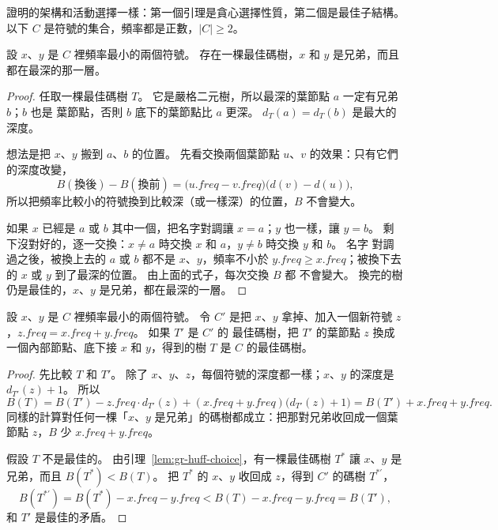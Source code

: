 證明的架構和活動選擇一樣：第一個引理是貪心選擇性質，第二個是最佳子結構。 以下 $C$
是符號的集合，頻率都是正數，$|C| \ge 2$。

\begin{lemma}
\label{lem:gr-huff-choice}
設 $x$、$y$ 是 $C$ 裡頻率最小的兩個符號。 存在一棵最佳碼樹，$x$ 和 $y$ 是兄弟，而且
都在最深的那一層。
\end{lemma}

\begin{proof}
任取一棵最佳碼樹 $T$。 它是嚴格二元樹，所以最深的葉節點 $a$ 一定有兄弟 $b$；$b$ 也是
葉節點，否則 $b$ 底下的葉節點比 $a$ 更深。 $d_T(a) = d_T(b)$ 是最大的深度。

想法是把 $x$、$y$ 搬到 $a$、$b$ 的位置。 先看交換兩個葉節點 $u$、$v$ 的效果：只有它們
的深度改變，
\[
B(\text{換後}) - B(\text{換前}) = \bigl(u.\mathit{freq} - v.\mathit{freq}\bigr)
\bigl(d(v) - d(u)\bigr),
\]
所以把頻率比較小的符號換到比較深（或一樣深）的位置，$B$ 不會變大。

如果 $x$ 已經是 $a$ 或 $b$ 其中一個，把名字對調讓 $x = a$；$y$ 也一樣，讓 $y = b$。
剩下沒對好的，逐一交換：$x \ne a$ 時交換 $x$ 和 $a$，$y \ne b$ 時交換 $y$ 和 $b$。 名字
對調過之後，被換上去的 $a$ 或 $b$ 都不是 $x$、$y$，頻率不小於 $y.\mathit{freq} \ge
x.\mathit{freq}$；被換下去的 $x$ 或 $y$ 到了最深的位置。 由上面的式子，每次交換 $B$ 都
不會變大。 換完的樹仍是最佳的，$x$、$y$ 是兄弟，都在最深的一層。
\end{proof}

\begin{lemma}
\label{lem:gr-huff-sub}
設 $x$、$y$ 是 $C$ 裡頻率最小的兩個符號。 令 $C'$ 是把 $x$、$y$ 拿掉、加入一個新符號
$z$，$z.\mathit{freq} = x.\mathit{freq} + y.\mathit{freq}$。 如果 $T'$ 是 $C'$ 的
最佳碼樹，把 $T'$ 的葉節點 $z$ 換成一個內部節點、底下接 $x$ 和 $y$，得到的樹 $T$ 是
$C$ 的最佳碼樹。
\end{lemma}

\begin{proof}
先比較 $T$ 和 $T'$。 除了 $x$、$y$、$z$，每個符號的深度都一樣；$x$、$y$ 的深度是
$d_{T'}(z) + 1$。 所以
\[
B(T) = B(T') - z.\mathit{freq} \cdot d_{T'}(z)
+ (x.\mathit{freq} + y.\mathit{freq})\bigl(d_{T'}(z) + 1\bigr)
= B(T') + x.\mathit{freq} + y.\mathit{freq}.
\]
同樣的計算對任何一棵「$x$、$y$ 是兄弟」的碼樹都成立：把那對兄弟收回成一個葉節點
$z$，$B$ 少 $x.\mathit{freq} + y.\mathit{freq}$。

假設 $T$ 不是最佳的。 由引理~\ref{lem:gr-huff-choice}，有一棵最佳碼樹 $T^*$ 讓 $x$、$y$
是兄弟，而且 $B(T^*) < B(T)$。 把 $T^*$ 的 $x$、$y$ 收回成 $z$，得到 $C'$ 的碼樹
$T^{*\prime}$，
\[
B(T^{*\prime}) = B(T^*) - x.\mathit{freq} - y.\mathit{freq}
< B(T) - x.\mathit{freq} - y.\mathit{freq} = B(T'),
\]
和 $T'$ 是最佳的矛盾。
\end{proof}

